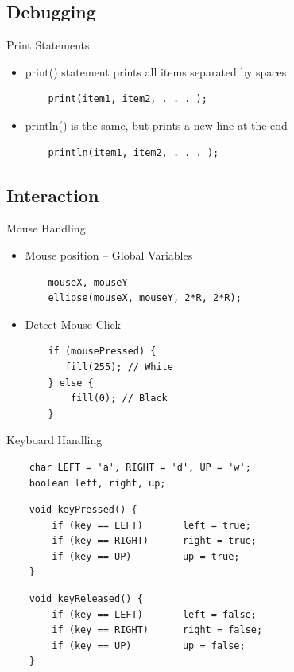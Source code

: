 \subsection{Debugging}
\begin{frame}[fragile]{Print Statements}{}
    \begin{itemize}
    \item print() statement prints all items separated by spaces
    \begin{verbatim}
    print(item1, item2, . . . );
    \end{verbatim}
    \pause
    \item println() is the same, but prints a new line at the end
    \begin{verbatim}
    println(item1, item2, . . . );
    \end{verbatim}
    \end{itemize}
\end{frame}


\subsection{Interaction}
\begin{frame}[fragile]{Mouse Handling}{}
    \begin{itemize}
    \item Mouse position -- Global Variables
    \begin{verbatim}
    mouseX, mouseY
    ellipse(mouseX, mouseY, 2*R, 2*R);
    \end{verbatim}
    \pause
    \item Detect Mouse Click
    \begin{verbatim}
    if (mousePressed) {
       fill(255); // White
    } else {
        fill(0); // Black
    }
    \end{verbatim}
    \end{itemize}
\end{frame}

\begin{frame}[fragile]{Keyboard Handling}{}
    \Large
    \begin{verbatim}
    char LEFT = 'a', RIGHT = 'd', UP = 'w';
    boolean left, right, up;
    \end{verbatim}
    \pause
    \begin{verbatim}
    void keyPressed() {
        if (key == LEFT)       left = true;
        if (key == RIGHT)      right = true;
        if (key == UP)         up = true;
    }
    \end{verbatim}
    \pause
    \begin{verbatim}
    void keyReleased() {
        if (key == LEFT)       left = false;
        if (key == RIGHT)      right = false;
        if (key == UP)         up = false;
    }
    \end{verbatim}
\end{frame}

